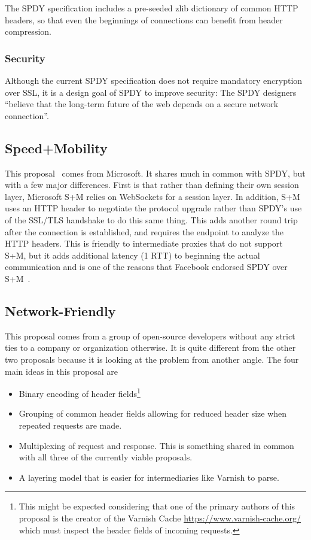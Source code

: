 \documentclass[11pt,letterpaper,notitlepage]{article}
\begin{document}
The SPDY specification includes a pre-seeded zlib dictionary of common HTTP
headers, so that even the beginnings of connections can benefit from header
compression.

\subsubsection{Security}
Although the current SPDY specification does not require mandatory encryption
over SSL, it is a design goal of SPDY to improve security: The SPDY designers
``believe that the long-term future of the web depends on a secure network
connection''\cite{spdy-whitepaper}.

\subsection{Speed+Mobility}
\label{sec:background/s+m}
This proposal~\cite{sm} comes from Microsoft.  It shares much in common with
SPDY, but with a few major differences. First is that rather than defining
their own session layer, Microsoft S+M relies on WebSockets for a session
layer.  In addition, S+M uses an HTTP header to negotiate the protocol upgrade
rather than SPDY's use of the SSL/TLS handshake to do this same thing. This
adds another round trip after the connection is established, and requires the
endpoint to analyze the HTTP headers. This is friendly to intermediate proxies
that do not support S+M, but it adds additional latency (1 RTT) to beginning
the actual communication and is one of the reasons that Facebook endorsed SPDY
over S+M~\cite{fbook}.

\subsection{Network-Friendly}
\label{sec:background/opensource}
This proposal comes from a group of open-source developers without any strict
ties to a company or organization otherwise.  It is quite different from the
other two proposals because it is looking at the problem from another angle.
The four main ideas in this proposal are~\cite{friendly}
\begin{itemize}
\item Binary encoding of header fields\footnote{This might be expected
considering that one of the primary authors of this proposal is the creator of
the Varnish Cache \url{https://www.varnish-cache.org/} which must inspect the
header fields of incoming requests.}
\item Grouping of common header fields allowing for reduced header size when
repeated requests are made.
\item Multiplexing of request and response.  This is something shared in common
with all three of the currently viable proposals.
\item A layering model that is easier for intermediaries like Varnish to parse.
\end{itemize}
\end{document}
